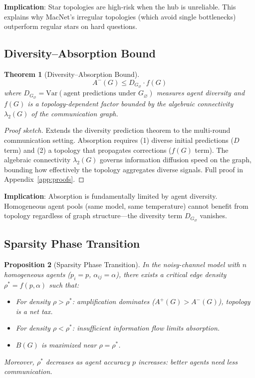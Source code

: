 \documentclass{article}
\newtheorem{theorem}{Theorem}
\newtheorem{proposition}[theorem]{Proposition}
\begin{document}
\textbf{Implication}: Star topologies are high-risk when the hub is unreliable. This explains why MacNet's irregular topologies (which avoid single bottlenecks) outperform regular stars on hard questions.

\subsection{Diversity--Absorption Bound}

\begin{theorem}[Diversity--Absorption Bound]
\label{thm:absorption}
\begin{equation}
    A^-(G) \leq D_{G_\varnothing} \cdot f(G)
\end{equation}
where $D_{G_\varnothing} = \text{Var}(\text{agent predictions under } G_\varnothing)$ measures agent diversity and $f(G)$ is a topology-dependent factor bounded by the algebraic connectivity $\lambda_2(G)$ of the communication graph.
\end{theorem}

\begin{proof}[Proof sketch]
Extends the diversity prediction theorem \citep{krogh1995neural} to the multi-round communication setting. Absorption requires (1) diverse initial predictions ($D$ term) and (2) a topology that propagates corrections ($f(G)$ term). The algebraic connectivity $\lambda_2(G)$ governs information diffusion speed on the graph, bounding how effectively the topology aggregates diverse signals. Full proof in Appendix~\ref{app:proofs}.
\end{proof}

\textbf{Implication}: Absorption is fundamentally limited by agent diversity. Homogeneous agent pools (same model, same temperature) cannot benefit from topology regardless of graph structure---the diversity term $D_{G_\varnothing}$ vanishes.

\subsection{Sparsity Phase Transition}

\begin{proposition}[Sparsity Phase Transition]
\label{prop:phase-transition}
In the noisy-channel model with $n$ homogeneous agents ($p_i = p$, $\alpha_{ij} = \alpha$), there exists a critical edge density $\rho^* = f(p, \alpha)$ such that:
\begin{itemize}
    \item For density $\rho > \rho^*$: amplification dominates ($A^+(G) > A^-(G)$), topology is a net tax.
    \item For density $\rho < \rho^*$: insufficient information flow limits absorption.
    \item $B(G)$ is maximized near $\rho = \rho^*$.
\end{itemize}
Moreover, $\rho^*$ decreases as agent accuracy $p$ increases: better agents need less communication.
\end{proposition}
\end{document}
